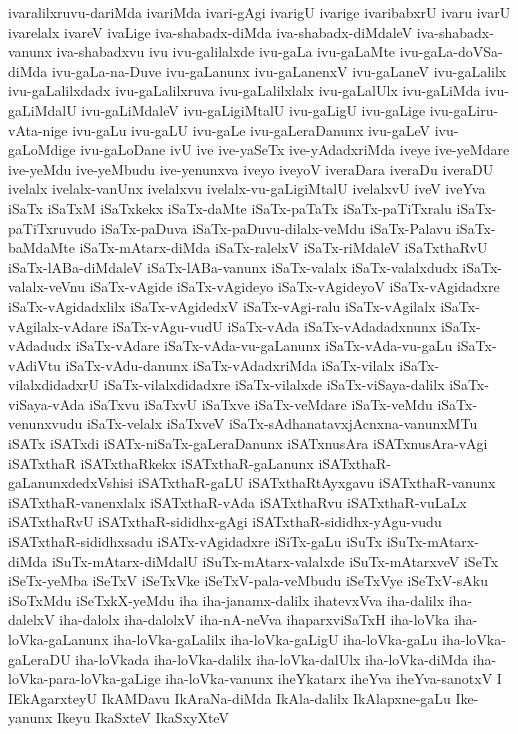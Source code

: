 {ivaralilxruvu-dariMda
ivariMda
ivari-gAgi
ivarigU
ivarige
ivaribabxrU
ivaru
ivarU
ivarelalx
ivareV
ivaLige
iva-shabadx-diMda
iva-shabadx-diMdaleV
iva-shabadx-vanunx
iva-shabadxvu
ivu
ivu-galilalxde
ivu-gaLa
ivu-gaLaMte
ivu-gaLa-doVSa-diMda
ivu-gaLa-na-Duve
ivu-gaLanunx
ivu-gaLanenxV
ivu-gaLaneV
ivu-gaLalilx
ivu-gaLalilxdadx
ivu-gaLalilxruva
ivu-gaLalilxlalx
ivu-gaLalUlx
ivu-gaLiMda
ivu-gaLiMdalU
ivu-gaLiMdaleV
ivu-gaLigiMtalU
ivu-gaLigU
ivu-gaLige
ivu-gaLiru-vAta-nige
ivu-gaLu
ivu-gaLU
ivu-gaLe
ivu-gaLeraDanunx
ivu-gaLeV
ivu-gaLoMdige
ivu-gaLoDane
ivU
ive
ive-yaSeTx
ive-yAdadxriMda
iveye
ive-yeMdare
ive-yeMdu
ive-yeMbudu
ive-yenunxva
iveyo
iveyoV
iveraDara
iveraDu
iveraDU
ivelalx
ivelalx-vanUnx
ivelalxvu
ivelalx-vu-gaLigiMtalU
ivelalxvU
iveV
iveYva
iSaTx
iSaTxM
iSaTxkekx
iSaTx-daMte
iSaTx-paTaTx
iSaTx-paTiTxralu
iSaTx-paTiTxruvudo
iSaTx-paDuva
iSaTx-paDuvu-dilalx-veMdu
iSaTx-Palavu
iSaTx-baMdaMte
iSaTx-mAtarx-diMda
iSaTx-ralelxV
iSaTx-riMdaleV
iSaTxthaRvU
iSaTx-lABa-diMdaleV
iSaTx-lABa-vanunx
iSaTx-valalx
iSaTx-valalxdudx
iSaTx-valalx-veVnu
iSaTx-vAgide
iSaTx-vAgideyo
iSaTx-vAgideyoV
iSaTx-vAgidadxre
iSaTx-vAgidadxlilx
iSaTx-vAgidedxV
iSaTx-vAgi-ralu
iSaTx-vAgilalx
iSaTx-vAgilalx-vAdare
iSaTx-vAgu-vudU
iSaTx-vAda
iSaTx-vAdadadxnunx
iSaTx-vAdadudx
iSaTx-vAdare
iSaTx-vAda-vu-gaLanunx
iSaTx-vAda-vu-gaLu
iSaTx-vAdiVtu
iSaTx-vAdu-danunx
iSaTx-vAdadxriMda
iSaTx-vilalx
iSaTx-vilalxdidadxrU
iSaTx-vilalxdidadxre
iSaTx-vilalxde
iSaTx-viSaya-dalilx
iSaTx-viSaya-vAda
iSaTxvu
iSaTxvU
iSaTxve
iSaTx-veMdare
iSaTx-veMdu
iSaTx-venunxvudu
iSaTx-velalx
iSaTxveV
iSaTx-sAdhanatavxjAcnxna-vanunxMTu
iSATx
iSATxdi
iSATx-niSaTx-gaLeraDanunx
iSATxnusAra
iSATxnusAra-vAgi
iSATxthaR
iSATxthaRkekx
iSATxthaR-gaLanunx
iSATxthaR-gaLanunxdedxVshisi
iSATxthaR-gaLU
iSATxthaRtAyxgavu
iSATxthaR-vanunx
iSATxthaR-vanenxlalx
iSATxthaR-vAda
iSATxthaRvu
iSATxthaR-vuLaLx
iSATxthaRvU
iSATxthaR-sididhx-gAgi
iSATxthaR-sididhx-yAgu-vudu
iSATxthaR-sididhxsadu
iSATx-vAgidadxre
iSiTx-gaLu
iSuTx
iSuTx-mAtarx-diMda
iSuTx-mAtarx-diMdalU
iSuTx-mAtarx-valalxde
iSuTx-mAtarxveV
iSeTx
iSeTx-yeMba
iSeTxV
iSeTxVke
iSeTxV-pala-veMbudu
iSeTxVye
iSeTxV-sAku
iSoTxMdu
iSeTxkX-yeMdu
iha
iha-janamx-dalilx
ihatevxVva
iha-dalilx
iha-dalelxV
iha-dalolx
iha-dalolxV
iha-nA-neVva
ihaparxviSaTxH
iha-loVka
iha-loVka-gaLanunx
iha-loVka-gaLalilx
iha-loVka-gaLigU
iha-loVka-gaLu
iha-loVka-gaLeraDU
iha-loVkada
iha-loVka-dalilx
iha-loVka-dalUlx
iha-loVka-diMda
iha-loVka-para-loVka-gaLige
iha-loVka-vanunx
iheYkatarx
iheYva
iheYva-sanotxV
I
IEkAgarxteyU
IkAMDavu
IkAraNa-diMda
IkAla-dalilx
IkAlapxne-gaLu
Ike-yanunx
Ikeyu
IkaSxteV
IkaSxyXteV
}
